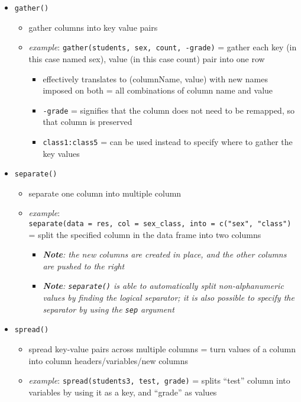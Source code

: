 \documentclass[
]{article}
\providecommand{\tightlist}{%
  \setlength{\itemsep}{0pt}\setlength{\parskip}{0pt}}
\begin{document}
\begin{itemize}
\tightlist
\item
  \texttt{gather()}

  \begin{itemize}
  \tightlist
  \item
    gather columns into key value pairs
  \item
    \emph{example}: \texttt{gather(students,\ sex,\ count,\ -grade)} =
    gather each key (in this case named sex), value (in this case count)
    pair into one row

    \begin{itemize}
    \tightlist
    \item
      effectively translates to (columnName, value) with new names
      imposed on both = all combinations of column name and value
    \item
      \texttt{-grade} = signifies that the column does not need to be
      remapped, so that column is preserved
    \item
      \texttt{class1:class5} = can be used instead to specify where to
      gather the key values
    \end{itemize}
  \end{itemize}
\item
  \texttt{separate()}

  \begin{itemize}
  \tightlist
  \item
    separate one column into multiple column
  \item
    \emph{example}:
    \texttt{separate(data\ =\ res,\ col\ =\ sex\_class,\ into\ =\ c("sex",\ "class")}
    = split the specified column in the data frame into two columns

    \begin{itemize}
    \tightlist
    \item
      \emph{\textbf{Note}: the new columns are created in place, and the
      other columns are pushed to the right }
    \item
      \emph{\textbf{Note}: \texttt{separate()} is able to automatically
      split non-alphanumeric values by finding the logical separator; it
      is also possible to specify the separator by using the
      \texttt{sep} argument }
    \end{itemize}
  \end{itemize}
\item
  \texttt{spread()}

  \begin{itemize}
  \tightlist
  \item
    spread key-value pairs across multiple columns = turn values of a
    column into column headers/variables/new columns
  \item
    \emph{example}: \texttt{spread(students3,\ test,\ grade)} = splits
    ``test'' column into variables by using it as a key, and ``grade''
    as values


\end{itemize}
\end{itemize}
\end{document}
